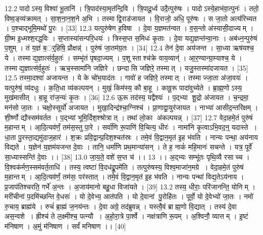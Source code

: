 12.2
पादोऽस्य॒ विश्वा॑ भू॒तानि॑ । त्रि॒पाद॑स्या॒मृत॑न्दि॒वि । त्रि॒पादू॒र्ध्व उदै॒त्पुरु॑षः । पादोऽस्ये॒हाभ॑वा॒त्पुनः॑ । ततो॒ विष्व॒ङ्व्य॑क्रामत् । सा॒श॒ना॒न॒श॒ने अ॒भि । तस्माद्वि॒राड॑जायत । वि॒राजो॒ अधि॒ पूरु॑षः । स जा॒तो अत्य॑रिच्यत । प॒श्चाद्भूमि॒मथो॑ पु॒रः । [33]
12.3
यत्पुरु॑षेण ह॒विषा । दे॒वा य॒ज्ञमत॑न्वत । व॒स॒न्तो अ॑स्यासी॒दाज्यम् । ग्री॒ष्म इ॒ध्मश्श॒रद्ध॒विः । स॒प्तास्या॑सन्परि॒धयः॑ । त्रिस्स॒प्त स॒मिधः॑ कृ॒ताः । दे॒वा यद्य॒ज्ञन्त॑न्वा॒नाः । अब॑ध्न॒न्पुरु॑षं प॒शुम् । तं य॒ज्ञं ब॒र््॒हिषि॒ प्रौक्षन्न्॑ । पुरु॑षं जा॒तम॑ग्र॒तः । [34]
12.4
तेन॑ दे॒वा अय॑जन्त । सा॒ध्या ऋष॑यश्च॒ ये । तस्माद्य॒ज्ञात्स॑र्व॒हुतः॑ । सम्भृ॑तं पृषदा॒ज्यम् । प॒शूस्ताश्च॑क्रे वाय॒व्यान्॑ । आ॒र॒ण्यान्ग्रा॒म्याश्च॒ ये । तस्माद्य॒ज्ञात्स॑र्व॒हुतः॑ । ऋच॒स्सामा॑नि जज्ञिरे । छन्दासि जज्ञिरे॒ तस्मात् । यजु॒स्तस्मा॑दजायत । [35]
12.5
तस्मा॒दश्वा॑ अजायन्त । ये के चो॑भ॒याद॑तः । गावो॑ ह जज्ञिरे॒ तस्मात् । तस्माज्जा॒ता अ॑जा॒वयः॑ । यत्पुरु॑षं॒ व्य॑दधुः । क॒ति॒धा व्य॑कल्पयन् । मुखं॒ किम॑स्य॒ कौ बा॒हू । कावू॒रू पादा॑वुच्येते । ब्रा॒ह्म॒णोऽस्य॒ मुख॑मासीत् । बा॒हू रा॑ज॒न्यः॑ कृ॒तः । [36]
12.6
ऊ॒रू तद॑स्य॒ यद्वैश्यः॑ । प॒द्भ्या शू॒द्रो अ॑जायत । च॒न्द्रमा॒ मन॑सो जा॒तः । चक्षो॒स्सूर्यो॑ अजायत । मुखा॒दिन्द्र॑श्चा॒ग्निश्च॑ । प्रा॒णाद्वा॒युर॑जायत । नाभ्या॑ आसीद॒न्तरि॑क्षम् । शी॒र्ष्णो द्यौस्सम॑वर्तत । प॒द्भ्यां भूमि॒र्दिश॒श्श्रोत्रात् । तथा॑ लो॒का अ॑कल्पयन्न् । [37]
12.7
वेदा॒हमे॒तं पुरु॑षं म॒हान्तम् । आ॒दि॒त्यव॑र्णं॒ तम॑स॒स्तु पा॒रे । सर्वा॑णि रू॒पाणि॑ वि॒चित्य॒ धीरः॑ । नामा॑नि कृ॒त्वाऽभि॒वद॒न्॒ यदास्ते । धा॒ता पु॒रस्ता॒द्यमु॑दाज॒हार॑ । श॒क्रः प्रवि॒द्वान्प्र॒दिश॒श्चत॑स्रः । तमे॒वं वि॒द्वान॒मृत॑ इ॒ह भ॑वति । नान्यः पन्था॒ अय॑नाय विद्यते । य॒ज्ञेन॑ य॒ज्ञम॑यजन्त दे॒वाः । तानि॒ धर्मा॑णि प्रथ॒मान्या॑सन् । ते ह॒ नाकं॑ महि॒मानः॑ सचन्ते । यत्र॒ पूर्वे॑ सा॒ध्यास्सन्ति॑ दे॒वाः ।। [38]
13.0
जा॒य॒ते॒ वशे॑ स॒प्त च॑ ।। 13 ।।
अ॒द्भ्यः सम्भू॑तः पृथि॒व्यै रसाच्च । वि॒श्वक॑र्मण॒स्सम॑वर्त॒ताधि॑ । तस्य॒ त्वष्टा॑ वि॒दध॑द्रू॒पमे॑ति । तत्पुरु॑षस्य॒ विश्व॒माजा॑न॒मग्रे । वेदा॒हमे॒तं पुरु॑षं म॒हान्तम् । आ॒दि॒त्यव॑र्णं॒ तम॑सः॒ पर॑स्तात् । तमे॒वं वि॒द्वान॒मृत॑ इ॒ह भ॑वति । नान्यः पन्था॑ विद्य॒तेऽय॑नाय । प्र॒जाप॑तिश्चरति॒ गर्भे॑ अ॒न्तः । अ॒जाय॑मानो बहु॒धा विजा॑यते । [39]
13.2
तस्य॒ धीराः॒ परि॑जानन्ति॒ योनिम् । मरी॑चीनां प॒दमि॑च्छन्ति वे॒धसः॑ । यो दे॒वेभ्य॒ आत॑पति । यो दे॒वानां पु॒रोहि॑तः । पूर्वो॒ यो दे॒वेभ्यो॑ जा॒तः । नमो॑ रु॒चाय॒ ब्राह्म॑ये । रुचं॑ ब्रा॒ह्मं ज॒नय॑न्तः । दे॒वा अग्रे॒ तद॑ब्रुवन्न् । यस्त्वै॒वं ब्राह्म॒णो वि॒द्यात् । तस्य॑ दे॒वा अस॒न्वशे । ह्रीश्च॑ ते ल॒क्ष्मीश्च॒ पत्न्यौ । अ॒हो॒रा॒त्रे पा॒र्श्वे । नक्ष॑त्राणि रू॒पम् । अ॒श्विनौ॒ व्यात्तम् । इ॒ष्टं म॑निषाण । अ॒मुं म॑निषाण । सर्वं॑ मनिषाण ।। [40]
